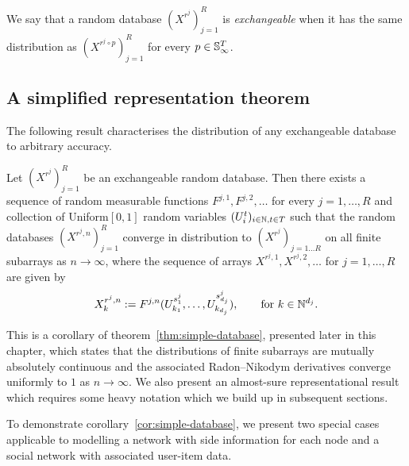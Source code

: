 \begin{definition}
\label{def:arrays:exdatabase}
We say that a random database $(X^{r^j})_{j=1}^R$ is \emph{exchangeable} when it has the same distribution as $(X^{r^j\circ p})_{j=1}^R$ for every $p \in \mathbb{S}_{\infty}^T$.
\end{definition}



\subsection{A simplified representation theorem}

The following result characterises the distribution of any exchangeable database to arbitrary accuracy.

\begin{cor}
  \label{cor:simple-database}
   Let $(X^{r^j})_{j=1}^R$ be an exchangeable random database.
   Then there exists a sequence of random measurable functions $F^{j,1}, F^{j,2}, \dotsc$ for 
   every $j=1,\ldots, R$ and collection of \iid Uniform$[0,1]$ random variables $(U^t_i)_{i\in\mathbb{N},t \in T}$ such that 
   the random databases $(X^{r^j,n})_{j=1}^R$
    converge in distribution to $(X^{r^j})_{j=1\ldots R}$ on all finite subarrays as $n\to \infty$, where   
   the sequence of arrays $X^{r^j,1},X^{r^j,2},\dotsc$ for $j = 1,\dotsc,R$ are given by
   \[
     X^{r^j,n}_{k} := F^{j,n}(U^{s^j_1}_{k_1},\dotsc,U^{s^j_{d_j}}_{k_{d_j}}), \qquad \text{for } k \in \mathbb{N}^{d_j}.
   \]
\end{cor}

This is a corollary of theorem~\ref{thm:simple-database}, presented later in this chapter, which states that the distributions of finite subarrays are mutually absolutely continuous and the associated Radon--Nikodym derivatives converge uniformly to $1$ as $n \to \infty$.
We also present an almost-sure representational result which requires some heavy notation which we build up in subsequent sections.

To demonstrate corollary~\ref{cor:simple-database}, we present two special cases applicable to modelling a network with side information for each node and a social network with associated user-item data.

